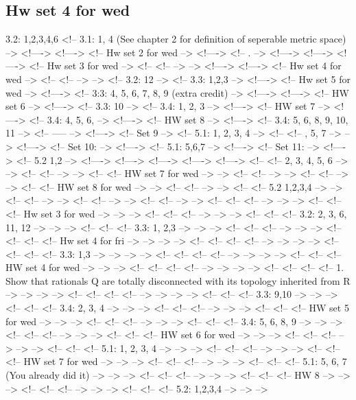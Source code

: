 \documentclass{amsart}
\numberwithin{equation}{section}
\theoremstyle{definition}
\theoremstyle{remark}
\begin{document}
\subsection{Hw set 4 for wed}
3.2: 1,2,3,4,6
<!-- 3.1: 1, 4 (See chapter 2 for definition of seperable metric space)   -->
<!---->
<!---->
<!-- Hw set 2 for wed   -->
<!---->
<!-- . -->
<!---->
<!---->
<!---->
<!-- Hw set 3 for wed  -->
<!-- <!--  --> -->
<!---->
<!---->
<!-- Hw set 4 for wed -->
<!-- <!--  --> -->
<!-- 3.2: 12   -->
<!-- 3.3: 1,2,3   -->
<!---->
<!-- Hw set 5 for wed  -->
<!---->
<!-- 3:3: 4, 5, 6, 7, 8, 9 (extra credit)     -->
<!---->
<!---->
<!-- HW set 6 -->
<!---->
<!-- 3.3: 10 -->
<!-- 3.4: 1, 2, 3    -->
<!---->
<!-- HW set 7 -->
<!---->
<!-- 3.4: 4, 5, 6,       -->
<!---->
<!-- HW set 8 -->
<!---->
<!-- 3.4: 5, 6, 8, 9, 10, 11     -->
<!-- -----  -->
<!---->
<!-- Set 9   -->
<!-- 5.1: 1, 2, 3, 4   -->
<!-- <!-- , 5, 7    --> -->
<!---->
<!-- Set 10: -->
<!---->
<!-- 5.1: 5,6,7    -->
<!---->
<!-- Set 11:  -->
<!---->
<!-- 5.2 1,2   -->
<!---->
<!---->
<!---->
<!---->
<!---->
<!-- <!-- 2, 3, 4, 5, 6 --> -->
<!-- <!--  --> -->
<!-- <!-- HW set 7 for wed --> -->
<!-- <!--  --> -->
<!-- <!--  --> -->
<!-- <!-- HW set 8 for wed --> -->
<!-- <!--  --> -->
<!-- <!-- 5.2 1,2,3,4   --> -->
<!-- <!--  --> -->
<!-- <!--  --> -->
<!-- <!--  --> -->
<!-- <!-- <!--  --> --> -->
<!-- <!-- <!-- Hw set 3 for wed --> --> -->
<!-- <!-- <!--  --> --> -->
<!-- <!-- <!-- 3.2: 2, 3, 6, 11, 12   --> --> -->
<!-- <!-- <!-- 3.3: 1, 2,3   --> --> -->
<!-- <!-- <!--  --> --> -->
<!-- <!-- <!-- <!-- Hw set 4 for fri --> --> --> -->
<!-- <!-- <!-- <!--  --> --> --> -->
<!-- <!-- <!-- <!-- 3.3: 1,3 --> --> --> -->
<!-- <!-- <!-- <!--  --> --> --> -->
<!-- <!-- <!-- HW set 4 for wed --> --> -->
<!-- <!-- <!-- <!--  --> --> --> -->
<!-- <!-- <!-- <!-- 1. Show that rationals Q are totally disconnected with its topology inherited from R --> --> --> -->
<!-- <!-- <!-- <!--  --> --> --> -->
<!-- <!-- <!-- 3.3: 9,10   --> --> -->
<!-- <!-- <!-- 3.4: 2, 3, 4 --> --> -->
<!-- <!-- <!--  --> --> -->
<!-- <!-- <!-- HW set 5 for wed --> --> -->
<!-- <!-- <!--  --> --> -->
<!-- <!-- <!-- 3.4: 5, 6, 8, 9 --> --> -->
<!-- <!-- <!--  --> --> -->
<!-- <!-- <!-- HW set 6 for wed --> --> -->
<!-- <!-- <!--  --> --> -->
<!-- <!-- <!-- 5.1: 1, 2, 3, 4 --> --> -->
<!-- <!-- <!--  --> --> -->
<!-- <!-- <!-- HW set 7 for wed --> --> -->
<!-- <!-- <!--  --> --> -->
<!-- <!-- <!-- 5.1: 5, 6, 7   (You already did it) --> --> -->
<!-- <!-- <!--  --> --> -->
<!-- <!-- <!-- HW 8 --> --> -->
<!-- <!-- <!--  --> --> -->
<!-- <!-- <!-- 5.2: 1,2,3,4   --> --> -->
\end{document}
